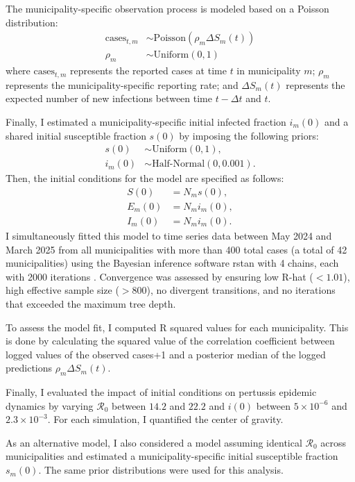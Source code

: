\documentclass[12pt]{article}
\begin{document}
The municipality-specific observation process is modeled based on a Poisson distribution:
\begin{align}
\mathrm{cases}_{t,m} &\sim \mathrm{Poisson}(\rho_m \Delta S_m(t))\\
\rho_m &\sim \textrm{Uniform}(0, 1)
\end{align}
where $\mathrm{cases}_{t,m}$ represents the reported cases at time $t$ in municipality $m$;
$\rho_m$ represents the municipality-specific reporting rate;
and $\Delta S_m(t)$ represents the expected number of new infections between time $t-\Delta t$ and $t$.

Finally, I estimated a municipality-specific initial infected fraction $i_m(0)$ and a shared initial susceptible fraction $s(0)$ by imposing the following priors:
\begin{align}
s(0) &\sim \textrm{Uniform}(0, 1),\\
i_m(0) &\sim \textrm{Half-Normal}(0, 0.001).
\end{align}
Then, the initial conditions for the model are specified as follows:
\begin{align}
S(0) &= N_m s(0),\\
E_m(0) &= N_m i_m(0),\\
I_m(0) &= N_m i_m(0).
\end{align}
I simultaneously fitted this model to time series data between May 2024 and March 2025 from all municipalities with more than 400 total cases (a total of 42 municipalities) using the Bayesian inference software rstan with 4 chains, each with 2000 iterations \citep{carpenter2017stan}.
Convergence was assessed by ensuring low R-hat ($<1.01$), high effective sample size ($>800$), no divergent transitions, and no iterations that exceeded the maximum tree depth.

To assess the model fit, I computed R squared values for each municipality. 
This is done by calculating the squared value of the correlation coefficient between logged values of the observed cases+1 and a posterior median of the logged predictions $\rho_m \Delta S_m(t)$.

Finally, I evaluated the impact of initial conditions on pertussis epidemic dynamics by varying $\mathcal R_0$ between $14.2$ and $22.2$ and $i(0)$ between $5\times 10^{-6}$ and $2.3\times 10^{-3}$.
For each simulation, I quantified the center of gravity.

As an alternative model, I also considered a model assuming identical $\mathcal R_0$ across municipalities and estimated a municipality-specific initial susceptible fraction $s_m(0)$.
The same prior distributions were used for this analysis.
\end{document}
